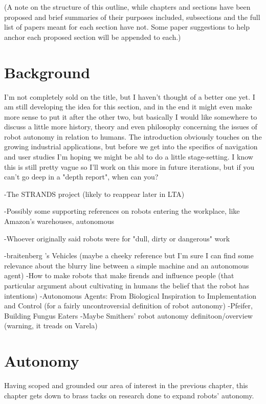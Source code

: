 \documentclass{sfuthesis}
\begin{document}
(A note on the structure of this outline, while chapters and sections have been proposed and brief summaries of their purposes included, subsections and the full list of papers meant for each section have not. Some paper suggestions to help anchor each proposed section will be appended to each.)

\chapter{Background}

I'm not completely sold on the title, but I haven't thought of a better one yet. I am still developing the idea for this section, and in the end it might even make more sense to put it after the other two, but basically I would like somewhere to discuss a little more history, theory and even philosophy concerning the issues of robot autonomy in relation to humans. The introduction obviously touches on the growing industrial applications, but before we get into the specifics of navigation and user studies I'm hoping we might be abl to do a little stage-setting. I know this is still pretty vague so I'll work on this more in future iterations, but if you can't go deep in a "depth report", when can you?


-The STRANDS project (likely to reappear later in LTA)

-Possibly some supporting references on robots entering the workplace, like Amazon's warehouses, autonomous 

-Whoever originally said robots were for "dull, dirty or dangerous" work

-braitenberg 's Vehicles (maybe a cheeky reference but I'm sure I can find some relevance about the blurry line between a simple machine and an autonomous agent)
-How to make robots that make firends and influence people (that particular argument about cultivating in humans the belief that the robot has intentions)
-Autonomous Agents: From Biological Inspiration to Implementation and Control (for a fairly uncontroversial definition of robot autonomy)
-Pfeifer, Building Fungus Eaters
-Maybe Smithers' robot autonomy definitoon/overview (warning, it treads on Varela)

\chapter{Autonomy}

Having scoped and grounded our area of interest in the previous chapter, this chapter gets down to brass tacks on research done to expand robots' autonomy.
\end{document}
